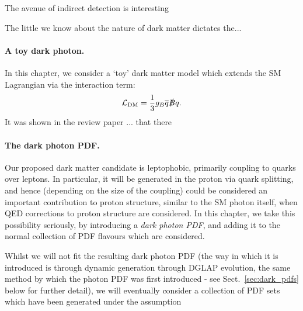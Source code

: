 \documentclass[withindex,glossary]{cam-thesis}
\begin{document}
The avenue of indirect detection is interesting 

The little we know about the nature of dark matter dictates the...


\paragraph{A toy dark photon.} In this chapter, we consider a `toy' dark matter model which extends the SM Lagrangian via the interaction term:
\begin{equation}
\label{eq:dm_lagrangian}
\mathcal{L}_{\text{DM}} = \frac{1}{3}g_B \overline{q} \slashed{B} q.
\end{equation}
It was shown in the review paper ... that there


\paragraph{The dark photon PDF.} Our proposed dark matter candidate is leptophobic, primarily coupling to quarks over leptons. In particular, it will be generated in the proton via quark splitting, and hence (depending on the size of the coupling) could be considered an important contribution to proton structure, similar to the SM photon itself, when QED corrections to proton structure are considered. In this chapter, we take this possibility seriously, by introducing a \textit{dark photon PDF}, and adding it to the normal collection of PDF flavours which are considered. 

Whilst we will not fit the resulting dark photon PDF (the way in which it is introduced is through dynamic generation through DGLAP evolution, the same method by which the photon PDF was first introduced - see Sect.~\ref{sec:dark_pdfs} below for further detail), we will eventually consider a collection of PDF sets which have been generated under the assumption 
\end{document}
